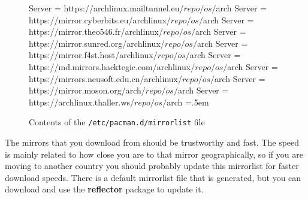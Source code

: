 \documentclass{article}
\newenvironment{cverbatim}
    {\SaveVerbatim{cverb}}
    {\endSaveVerbatim
    \flushleft\fboxrule=0pt\fboxsep=.5em
    \colorbox{cverbbg}{%
      \makebox[\dimexpr\linewidth-2\fboxsep][l]{\BUseVerbatim{cverb}}%
    }
    \endflushleft
  }
\begin{document}
    \begin{figure}
      \begin{cverbatim}
        Server = https://archlinux.mailtunnel.eu/$repo/os/$arch
        Server = https://mirror.cyberbits.eu/archlinux/$repo/os/$arch
        Server = https://mirror.theo546.fr/archlinux/$repo/os/$arch
        Server = https://mirror.sunred.org/archlinux/$repo/os/$arch
        Server = https://mirror.f4st.host/archlinux/$repo/os/$arch
        Server = https://md.mirrors.hacktegic.com/archlinux/$repo/os/$arch
        Server = https://mirrors.neusoft.edu.cn/archlinux/$repo/os/$arch
        Server = https://mirror.moson.org/arch/$repo/os/$arch
        Server = https://archlinux.thaller.ws/$repo/os/$arch
      \end{cverbatim}
      \caption{Contents of the \texttt{/etc/pacman.d/mirrorlist} file}\label{fig:mirrorlist}
    \end{figure}
    
    The mirrors that you download from should be trustworthy and fast. The speed is mainly related to how close you are to that mirror geographically, so if you are moving to another country you should probably update this mirrorlist for faster download speeds. There is a default mirrorlist file that is generated, but you can download and use the \textbf{reflector} package to update it.  
\end{document}
